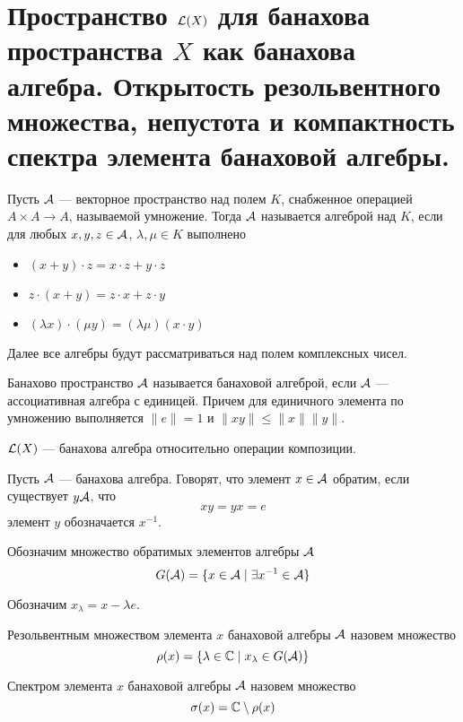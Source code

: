 \newpage
\section{Пространство $\mathcal{L}(X)$ для банахова пространства $X$ как банахова алгебра. Открытость резольвентного множества, непустота и компактность спектра элемента банаховой алгебры.}
\begin{definition}
	Пусть $\mathcal{A}$ --- векторное пространство над полем $K$, снабженное операцией $A \times A \to A$, называемой умножение. Тогда $\mathcal{A}$ называется алгеброй над $K$, если для любых $x,y,z \in \mathcal{A}$, $\lambda, \mu \in K$ выполнено
	\begin{itemize}
		\item $(x + y) \cdot z = x \cdot z + y \cdot z$
		\item $z \cdot (x + y) = z \cdot x + z \cdot y$
		\item $(\lambda x) \cdot (\mu y) = (\lambda \mu ) (x \cdot y)$
	\end{itemize}
\end{definition}
Далее все алгебры будут рассматриваться над полем комплексных чисел. 
\begin{definition}
	Банахово пространство $\mathcal{A}$  называется банаховой алгеброй, если $\mathcal{A}$ --- ассоциативная алгебра с единицей. Причем для единичного элемента по умножению выполняется $\|e\|  = 1$ и $\|x y\| \leq \|x\| \|y\|$. 
\end{definition}
\begin{example}
	$\mathcal{L}(X)$ --- банахова алгебра относительно операции композиции. 
\end{example}
\begin{definition}
	Пусть $\mathcal{A}$ --- банахова алгебра. Говорят, что элемент $x \in \mathcal{A}$ обратим, если существует $y \mathcal{A}$, что 
	$$
	xy = yx = e
	$$
	элемент $y$ обозначается $x^{-1}$.
\end{definition}
\begin{definition}
	Обозначим множество обратимых элементов алгебры $\mathcal{A}$
	$$
	G(\mathcal{A}) = \{x \in \mathcal{A} \mid \exists x^{-1} \in \mathcal{A}\}
	$$
\end{definition}
Обозначим $x_\lambda = x - \lambda e$. 
\begin{definition}
	Резольвентным множеством элемента $x$ банаховой алгебры $\mathcal{A}$ назовем множество 
	$$
	\rho(x) = \{\lambda \in \mathbb{C} \mid x_\lambda \in G(\mathcal{A})\}
	$$
\end{definition}
\begin{definition}
	Спектром элемента $x$ банаховой алгебры $\mathcal{A}$ назовем множество 
	$$
	\sigma(x) = \mathbb{C} \setminus \rho(x)
	$$
\end{definition}
